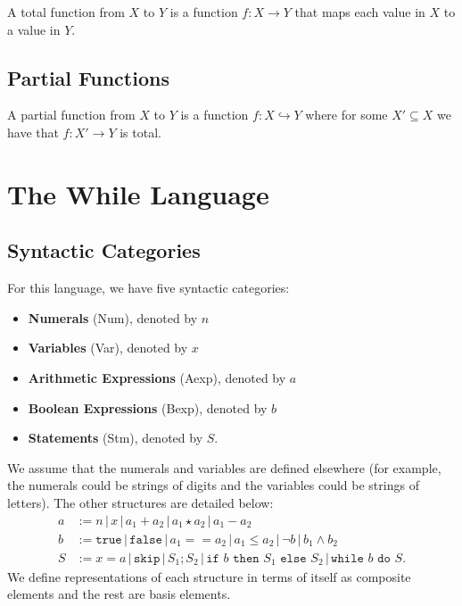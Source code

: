 \documentclass[a4paper, 12pt, twoside]{article}
\begin{document}
A total function from $X$ to $Y$ is a function $f : X \to Y$
that maps each value in $X$ to a value in $Y$. 

\subsection{Partial Functions}

A partial function from $X$ to $Y$ is a function 
$f : X \hookrightarrow Y$ where for some $X' \subseteq X$ we have
that $f : X' \to Y$ is total.

\newpage

\section{The While Language}

\subsection{Syntactic Categories}

For this language, we have five syntactic categories: \begin{itemize}
  \item \textbf{Numerals} (Num), denoted by $n$
  \item \textbf{Variables} (Var), denoted by $x$
  \item \textbf{Arithmetic Expressions} (Aexp), denoted by $a$
  \item \textbf{Boolean Expressions} (Bexp), denoted by $b$
  \item \textbf{Statements} (Stm), denoted by $S$.
\end{itemize} We assume that the numerals and variables are defined
elsewhere (for example, the numerals could be strings of digits
and the variables could be strings of letters). The other
structures are detailed below: \begin{align*}
  a &:= n \, | \, x \, | \, a_1 + a_2 \, | \, a_1 \star a_2 \, | \, a_1 - a_2 \\
  b &:= \texttt{true} \, | \, \texttt{false} \, | \, a_1 == a_2 \, 
  | \, a_1 \leq a_2 \, | \, \neg b \, | \, b_1 \land b_2 \\
  S &:= x = a \, | \, \texttt{skip} \, | \, S_1 ; S_2 \, | \, \texttt{if }
  b \texttt{ then } S_1 \texttt{ else } S_2 \, | \, \texttt{while } 
  b \texttt{ do } S.
\end{align*} We define representations of each structure in terms of itself
as composite elements and the rest are basis elements.
\end{document}
